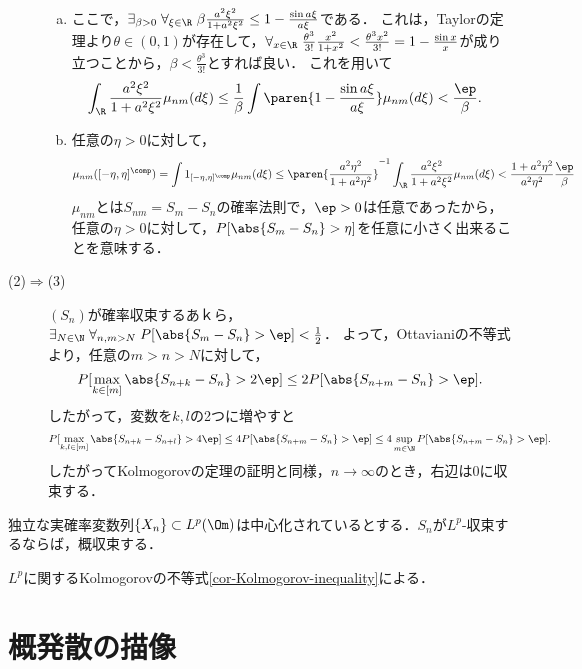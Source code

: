 \documentclass[uplatex,dvipdfmx]{jsreport}
\begin{document}
\begin{Proof}
\begin{description}
\begin{enumerate}[(a)]
            \item ここで，$\exists_{\beta>0}\;\forall_{\xi\in\R}\;\beta\frac{a^2\xi^2}{1+a^2\xi^2}\le1-\frac{\sin a\xi}{a\xi}$である．
            これは，Taylorの定理より$\theta\in(0,1)$が存在して，$\forall_{x\in\R}\;\frac{\theta^3}{3!}\frac{x^2}{1+x^2}<\frac{\theta^3x^2}{3!}=1-\frac{\sin x}{x}$が成り立つことから，$\beta<\frac{\theta^3}{3!}$とすれば良い．
            これを用いて
            \begin{align*}
                \int_\R\frac{a^2\xi^2}{1+a^2\xi^2}\mu_{nm}(d\xi)&\le\frac{1}{\beta}\int\paren{1-\frac{\sin a\xi}{a\xi}}\mu_{nm}(d\xi)<\frac{\ep}{\beta}.
            \end{align*}
            \item 任意の$\eta>0$に対して，
            \[\mu_{nm}([-\eta,\eta]^\comp)=\int 1_{[-\eta,\eta]^\comp}\mu_{nm}(d\xi)\le\paren{\frac{a^2\eta^2}{1+a^2\eta^2}}^{-1}\int_\R\frac{a^2\xi^2}{1+a^2\xi^2}\mu_{nm}(d\xi)<\frac{1+a^2\eta^2}{a^2\eta^2}\frac{\ep}{\beta}\]
            $\mu_{nm}$とは$S_{nm}=S_m-S_n$の確率法則で，$\ep>0$は任意であったから，
            任意の$\eta>0$に対して，$P[\abs{S_m-S_n}>\eta]$を任意に小さく出来ることを意味する．
        \end{enumerate}
        \item[(2)$\Rightarrow$(3)] $(S_n)$が確率収束するあｋら，$\exists_{N\in\N}\;\forall_{n,m>N}\;P[\abs{S_m-S_n}>\ep]<\frac{1}{2}$．
        よって，Ottavianiの不等式より，任意の$m>n>N$に対して，
        \[P[\max_{k\in[m]}\abs{S_{n+k}-S_n}>2\ep]\le 2P[\abs{S_{n+m}-S_n}>\ep].\]
        したがって，変数を$k,l$の2つに増やすと
        \[P[\max_{k,l\in[m]}\abs{S_{n+k}-S_{n+l}}>4\ep]\le 4P[\abs{S_{n+m}-S_n}>\ep]\le4\sup_{m\in\N}P[\abs{S_{n+m}-S_n}>\ep].\]
        したがってKolmogorovの定理の証明と同様，$n\to\infty$のとき，右辺は$0$に収束する．
    \end{description}
\end{Proof}

\begin{proposition}
    独立な実確率変数列$\{X_n\}\subset L^p(\Om)$は中心化されているとする．$S_n$が$L^p$-収束するならば，概収束する．
\end{proposition}
\begin{Proof}
    $L^p$に関するKolmogorovの不等式\ref{cor-Kolmogorov-inequality}による．
\end{Proof}

\section{概発散の描像}
\end{document}
